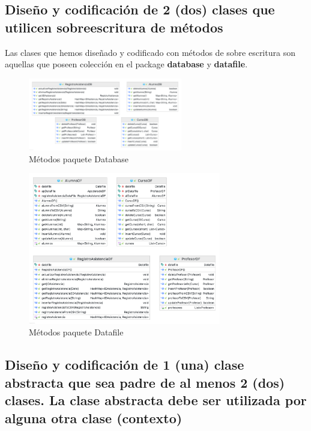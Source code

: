 \subsection{Diseño y codificación de 2 (dos) clases que utilicen sobreescritura de métodos}

Las clases que hemos diseñado y codificado con métodos de sobre escritura son aquellas que poseen colección en el package \textbf{database} y \textbf{datafile}.

\begin{figure}[h]
    \centering
    \includegraphics[width=0.6\textwidth]{contents/img/img8}
    \caption{Métodos paquete Database}
    \label{fig:img8}
\end{figure}

\clearpage

\begin{figure}[h]
    \centering
    \includegraphics[width=0.75\textwidth]{contents/img/img9}
    \caption{Métodos paquete Datafile}
    \label{fig:img9}
\end{figure}

\subsection{Diseño y codificación de 1 (una) clase abstracta que sea padre de al menos 2 (dos) clases. La clase abstracta debe ser utilizada por alguna otra clase (contexto)}

